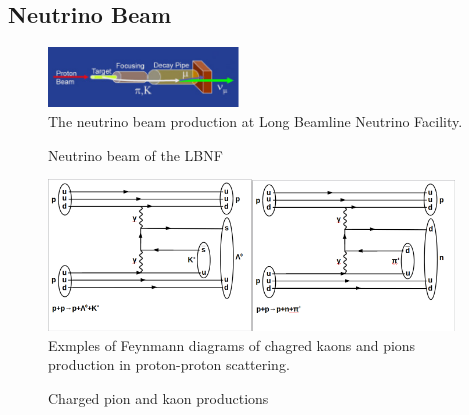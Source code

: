 \subsection{Neutrino Beam}

\begin{figure}
\caption{Neutrino beam of the LBNF}
\label{fig:LBNF_nuBeam}
\centering
\includegraphics[width=0.45\textwidth, keepaspectratio=true]{figs/LBNF_nuBeam.png}
\\The neutrino beam production at Long Beamline Neutrino Facility. \cite{ref_LBNFweb}   
\end{figure}


\begin{figure}
\caption{Charged pion and kaon productions}
\label{fig:pionAndKaonProductions}
\centering
\includegraphics[width=0.48\textwidth, keepaspectratio=true]{figs/ppKaonProduction.png}\includegraphics[width=0.48\textwidth, keepaspectratio=true]{figs/ppPionProduction.png}
\\Exmples of Feynmann diagrams of chagred kaons and pions production in proton-proton scattering.    
\end{figure}


